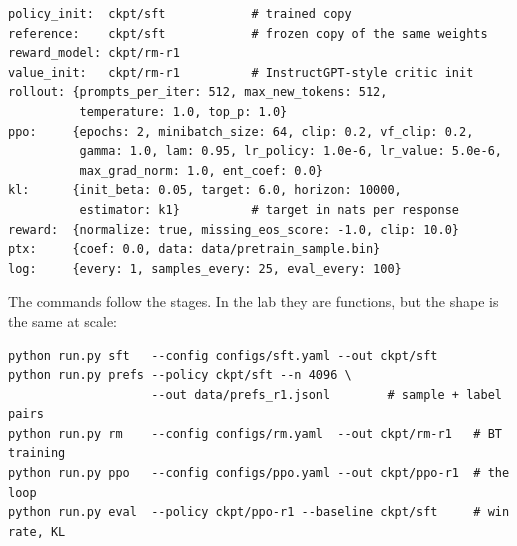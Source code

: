 \begin{lstlisting}[style=plain,caption={A PPO configuration with the knobs that matter, and values that are reasonable defaults for a first 1B--8B run.},label={lst:rlhf:yaml}]
policy_init:  ckpt/sft            # trained copy
reference:    ckpt/sft            # frozen copy of the same weights
reward_model: ckpt/rm-r1
value_init:   ckpt/rm-r1          # InstructGPT-style critic init
rollout: {prompts_per_iter: 512, max_new_tokens: 512,
          temperature: 1.0, top_p: 1.0}
ppo:     {epochs: 2, minibatch_size: 64, clip: 0.2, vf_clip: 0.2,
          gamma: 1.0, lam: 0.95, lr_policy: 1.0e-6, lr_value: 5.0e-6,
          max_grad_norm: 1.0, ent_coef: 0.0}
kl:      {init_beta: 0.05, target: 6.0, horizon: 10000,
          estimator: k1}          # target in nats per response
reward:  {normalize: true, missing_eos_score: -1.0, clip: 10.0}
ptx:     {coef: 0.0, data: data/pretrain_sample.bin}
log:     {every: 1, samples_every: 25, eval_every: 100}
\end{lstlisting}

The commands follow the stages. In the lab they are functions, but the shape is the same
at scale:

\begin{lstlisting}[style=shell,caption={The four stages as commands (the lab's \code{run.py} mirrors this).},label={lst:rlhf:cmds}]
python run.py sft   --config configs/sft.yaml --out ckpt/sft
python run.py prefs --policy ckpt/sft --n 4096 \
                    --out data/prefs_r1.jsonl        # sample + label pairs
python run.py rm    --config configs/rm.yaml  --out ckpt/rm-r1   # BT training
python run.py ppo   --config configs/ppo.yaml --out ckpt/ppo-r1  # the loop
python run.py eval  --policy ckpt/ppo-r1 --baseline ckpt/sft     # win rate, KL
\end{lstlisting}

